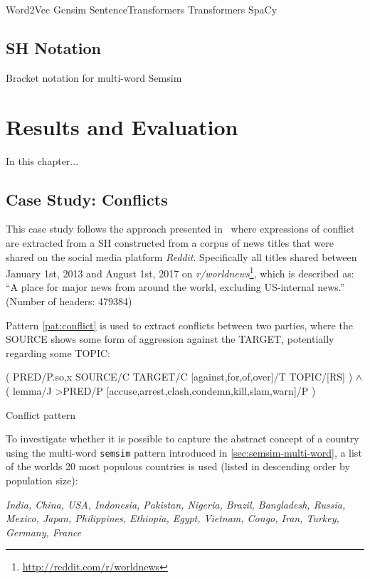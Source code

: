 \documentclass[11pt]{scrreprt}
\begin{document}
Word2Vec
Gensim
SentenceTransformers
Transformers
SpaCy




\section{SH Notation}
Bracket notation for multi-word Semsim



\chapter{Results and Evaluation}
In this chapter...

\section{Case Study: Conflicts}
This case study follows the approach presented in \cite[p.~22]{menezes_semantic_2021} where expressions of conflict are extracted from a SH constructed from a corpus of news titles that were shared on the social media platform \textit{Reddit}. Specifically all titles shared between January 1st, 2013 and August 1st, 2017 on \textit{r/worldnews}\footnote{\url{http://reddit.com/r/worldnews}}, which is described as: “A place for major news from around the world, excluding US-internal news.” (Number of headers: 479384)

Pattern \ref{pat:conflict} is used to extract conflicts between two parties, where the \textsf{SOURCE} shows some form of aggression against the \textsf{TARGET}, potentially regarding some \textsf{TOPIC}:

\begin{pattern}
  \normalfont\sffamily
  \centering
  ( PRED/P.{so,x} SOURCE/C TARGET/C [against,for,of,over]/T TOPIC/[RS] ) \(\wedge\)\\ ( lemma/J >PRED/P [accuse,arrest,clash,condemn,kill,slam,warn]/P )
  \caption{Conflict pattern}
  \label{pat:conflict}
\end{pattern}



To investigate whether it is possible to capture the abstract concept of a country using the multi-word \texttt{semsim} pattern introduced in \ref{sec:semsim-multi-word}, a list of the worlds 20 most populous countries \cite{wiki_list_of_countries} is used (listed in descending order by population size):


\textit{India, China, USA, Indonesia, Pakistan, Nigeria, Brazil, Bangladesh, Russia, Mexico, Japan, Philippines, Ethiopia, Egypt, Vietnam, Congo, Iran, Turkey, Germany, France}
\end{document}

